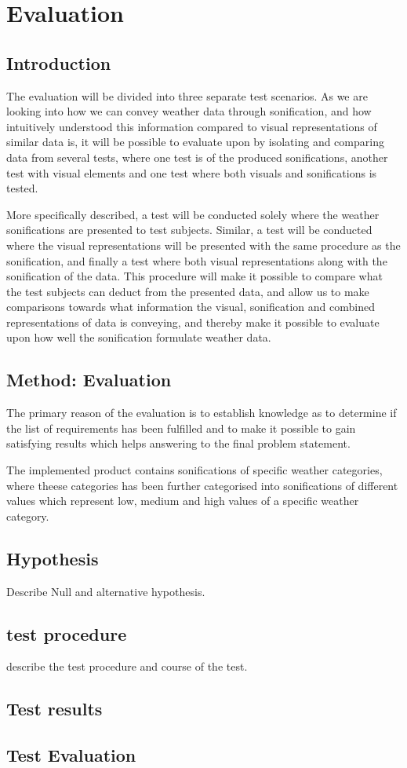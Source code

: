 \section{Evaluation} \label{sec:evaluation}


\subsection{Introduction}
The evaluation will be divided into three separate test scenarios. As we are looking into how we can convey weather data through sonification, and how intuitively understood this information compared to visual representations of similar data is, it will be possible to evaluate upon by isolating and comparing data from several tests, where one test is of the produced sonifications, another test with visual elements and one test where both visuals and sonifications is tested. 


More specifically described, a test will be conducted solely where the weather sonifications are presented to test subjects. Similar, a test will be conducted where the visual representations will be presented with the same procedure as the sonification, and finally a test where both visual representations along with the sonification of the data. 
This procedure will make it possible to compare what the test subjects can deduct from the presented data, and allow us to make comparisons towards what information the visual, sonification and combined representations of data is conveying, and thereby make it possible to evaluate upon how well the sonification formulate weather data.

\subsection{Method: Evaluation}
The primary reason of the evaluation is to establish knowledge as to determine if the list of requirements has been fulfilled and to make it possible to gain satisfying results which helps answering to the final problem statement.

The implemented product contains sonifications of specific weather categories, where theese categories has been further categorised into sonifications of different values which represent low, medium and high values of a specific weather category.



\subsection{Hypothesis}

Describe Null and alternative hypothesis.

\subsection{test procedure}

describe the test procedure and course of the test.

\subsection{Test results}

\subsection{Test Evaluation}


